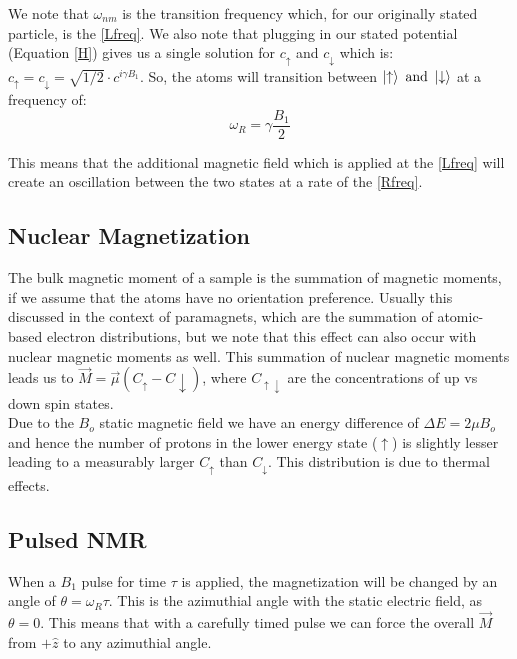 We note that $\omega_{nm}$ is the transition frequency which, for our originally stated particle, is the \ref{Lfreq}. We also note that plugging in our stated potential (Equation \ref{H}) gives us a single solution for $c_\uparrow$ and $c_\downarrow$ which is:
$c_\uparrow = c_\downarrow = \sqrt{1/2} \cdot c^{i \gamma B_1}$. So, the atoms will transition between $\ket{\uparrow} \text{ and } \ket{\downarrow}$ at a frequency of:
\begin{equation}
    \omega_R = \gamma \frac{B_1}{2} \tag{Rabi frequency} \label{Rfreq}
\end{equation}

This means that the additional magnetic field which is applied at the \ref{Lfreq} will create an oscillation between the two states at a rate of the \ref{Rfreq}.

\subsection{Nuclear Magnetization}

The bulk magnetic moment of a sample is the summation of magnetic moments, if we assume that the atoms have no orientation preference. Usually this discussed in the context of paramagnets, which are the summation of atomic-based electron distributions, but we note that this effect can also occur with nuclear magnetic moments as well. This summation of nuclear magnetic moments leads us to $\vec{M} = \vec{\mu} \left( C_\uparrow - C\downarrow \right)$, where $C_{\uparrow \downarrow}$ are the concentrations of up vs down spin states. \\

Due to the $B_o$ static magnetic field we have an energy difference of $\Delta E = 2 \mu B_o$ and hence the number of protons in the lower energy state ($\uparrow$) is slightly lesser leading to a measurably larger $C_\uparrow$ than $C_\downarrow$. This distribution is due to thermal effects.

\subsection{Pulsed NMR}
When a $B_1$ pulse for time $\tau$ is applied, the magnetization will be changed by an angle of $\theta = \omega_R \tau$. This is the azimuthial angle with the static electric field, as $\theta = 0$. This means that with a carefully timed pulse we can force the overall $\vec{M}$ from $+\hat{z}$ to any azimuthial angle.\\

